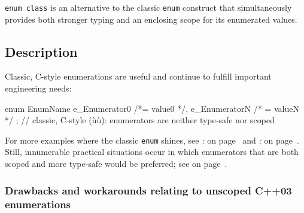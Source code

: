 


\setcounter{table}{0}
\setcounter{footnote}{0}
\setcounter{lstlisting}{0}

\texttt{enum}~\texttt{class} is an alternative to the classic
\texttt{enum} construct that simultaneously provides both stronger
typing and an enclosing scope for its enumerated values.

\subsection[Description]{Description}\label{description-enumclass}

Classic, C-style enumerations are useful and continue to fulfill
important engineering needs:

\begin{emcppslisting}
enum EnumName { e_Enumerator0 /*= value0 */, e_EnumeratorN /* = valueN */ };
    // classic, C-style (ù{}ù): enumerators are neither type-safe nor scoped
\end{emcppslisting}

\noindent For more examples where the classic \texttt{enum} shines, see \textit{: } on page~\pageref{strong-typing-of-an-enum-class-can-be-counterproductive} and \textit{: } on page~\pageref{scoped-enumerations-do-not-necessarily-add-value}. Still,
innumerable practical situations occur in which enumerators that are
both scoped and more type-safe would be preferred; see \textit{} on page~\pageref{introducing-the-c++11-enum-class}.

\subsubsection[Drawbacks and workarounds relating to unscoped C++03 enumerations]{Drawbacks and workarounds relating to unscoped C++03 enumerations}\label{drawbacks-and-workarounds-relating-to-unscoped-c++03-enumerations}


